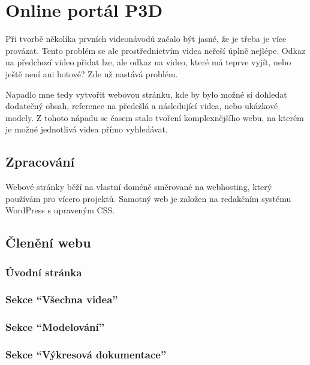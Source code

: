 \chapter{Online portál P3D}
Při tvorbě několika prvních videonávodů začalo být jasné, že je třeba je více provázat.
Tento problém se ale prostřednictvím videa neřeší úplně nejlépe. 
Odkaz na předchozí video přidat lze, ale odkaz na video, které má teprve vyjít, nebo ještě není ani hotové?
Zde už nastává problém.

Napadlo mne tedy vytvořit webovou stránku, kde by bylo možné si dohledat dodatečný obsah, reference na předešlá a následující videa, nebo ukázkové modely.
Z tohoto nápadu se časem stalo tvoření komplexnějšího webu, na kterém je možné jednotlivá videa přímo vyhledávat.

\section{Zpracování}
Webové stránky běží na vlastní doméně směrované na webhosting, který používám pro vícero projektů.
Samotný web je založen na redakčním systému WordPress s upraveným CSS.

\section{Členění webu}
\subsection*{Úvodní stránka}

\subsection*{Sekce \enquote{Všechna videa}}

\subsection*{Sekce \enquote{Modelování}}

\subsection*{Sekce \enquote{Výkresová dokumentace}}

\newpage